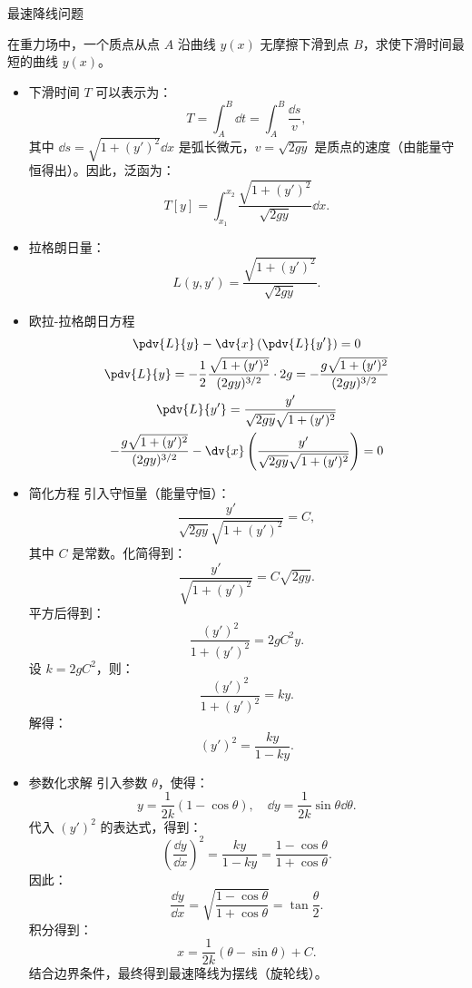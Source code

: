 \documentclass[12pt, a4paper, oneside, UTF8]{ctexbook}  %
\begin{document}
\begin{example}
最速降线问题

在重力场中，一个质点从点 \( A \) 沿曲线 \( y(x) \) 无摩擦下滑到点 \( B \)，求使下滑时间最短的曲线 \( y(x) \)。
\begin{itemize}
    \item 
下滑时间 \( T \) 可以表示为：
\[
T = \int_{A}^{B} \dd t = \int_{A}^{B} \frac{\dd s}{v},
\]
其中 \( \dd s = \sqrt{1 + (y')^2} \dd x \) 是弧长微元，\( v = \sqrt{2gy} \) 是质点的速度（由能量守恒得出）。因此，泛函为：
\[
T[y] = \int_{x_1}^{x_2} \frac{\sqrt{1 + (y')^2}}{\sqrt{2gy}} \dd x.
\]
\item 拉格朗日量：
\[
L(y, y') = \frac{\sqrt{1 + (y')^2}}{\sqrt{2gy}}.
\]
\item  欧拉-拉格朗日方程
\begin{gather*}
    \pdv{L}{y} - \dv{x} \left( \pdv{L}{y'} \right) = 0
\\
\pdv{L}{y} = -\frac{1}{2} \frac{\sqrt{1 + (y')^2}}{(2gy)^{3/2}} \cdot 2g 
= -\frac{g \sqrt{1 + (y')^2}}{(2gy)^{3/2}}
\\
\pdv{L}{y'} = \frac{y'}{\sqrt{2gy} \sqrt{1 + (y')^2}}
\\
-\frac{g \sqrt{1 + (y')^2}}{(2gy)^{3/2}} - \dv{x} 
\left( \frac{y'}{\sqrt{2gy} \sqrt{1 + (y')^2}} \right) = 0
\end{gather*}
\item  简化方程
引入守恒量（能量守恒）：
\[
\frac{y'}{\sqrt{2gy} \sqrt{1 + (y')^2}} = C,
\]
其中 \( C \) 是常数。化简得到：
\[
\frac{y'}{\sqrt{1 + (y')^2}} = C \sqrt{2gy}.
\]
平方后得到：
\[
\frac{(y')^2}{1 + (y')^2} = 2g C^2 y.
\]
设 \( k = 2g C^2 \)，则：
\[
\frac{(y')^2}{1 + (y')^2} = k y.
\]
解得：
\[
(y')^2 = \frac{k y}{1 - k y}.
\]
\item  参数化求解
引入参数 \( \theta \)，使得：
\[
y = \frac{1}{2k} (1 - \cos \theta), \quad \dd y = \frac{1}{2k} \sin \theta \dd \theta.
\]
代入 \( (y')^2 \) 的表达式，得到：
\[
\left( \frac{\dd y}{\dd x} \right)^2 = \frac{k y}{1 - k y} = \frac{1 - \cos \theta}{1 + \cos \theta}.
\]
因此：
\[
\frac{\dd y}{\dd x} = \sqrt{\frac{1 - \cos \theta}{1 + \cos \theta}} = \tan \frac{\theta}{2}.
\]
积分得到：
\[
x = \frac{1}{2k} (\theta - \sin \theta) + C.
\]
结合边界条件，最终得到最速降线为摆线（旋轮线）。
\end{itemize}
\end{example}



















\ifx\allfiles\undefined
\end{document}
